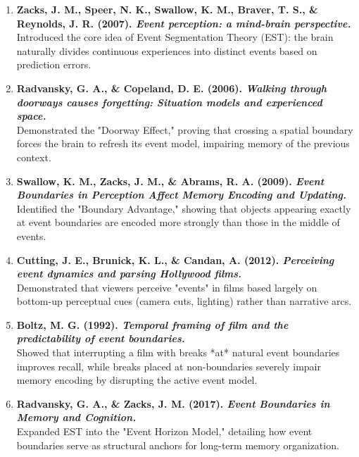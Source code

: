 \documentclass[10pt,a4paper]{article}
\begin{document}
\begin{enumerate}
    \item \textbf{Zacks, J. M., Speer, N. K., Swallow, K. M., Braver, T. S., \& Reynolds, J. R. (2007). \textit{Event perception: a mind-brain perspective.}} \\
    Introduced the core idea of Event Segmentation Theory (EST): the brain naturally divides continuous experiences into distinct events based on prediction errors.

    \item \textbf{Radvansky, G. A., \& Copeland, D. E. (2006). \textit{Walking through doorways causes forgetting: Situation models and experienced space.}} \\
    Demonstrated the "Doorway Effect," proving that crossing a spatial boundary forces the brain to refresh its event model, impairing memory of the previous context.

    \item \textbf{Swallow, K. M., Zacks, J. M., \& Abrams, R. A. (2009). \textit{Event Boundaries in Perception Affect Memory Encoding and Updating.}} \\
    Identified the "Boundary Advantage," showing that objects appearing exactly at event boundaries are encoded more strongly than those in the middle of events.

    \item \textbf{Cutting, J. E., Brunick, K. L., \& Candan, A. (2012). \textit{Perceiving event dynamics and parsing Hollywood films.}} \\
    Demonstrated that viewers perceive "events" in films based largely on bottom-up perceptual cues (camera cuts, lighting) rather than narrative arcs.

    \item \textbf{Boltz, M. G. (1992). \textit{Temporal framing of film and the predictability of event boundaries.}} \\
    Showed that interrupting a film with breaks *at* natural event boundaries improves recall, while breaks placed at non-boundaries severely impair memory encoding by disrupting the active event model.

    \item \textbf{Radvansky, G. A., \& Zacks, J. M. (2017). \textit{Event Boundaries in Memory and Cognition.}} \\
    Expanded EST into the "Event Horizon Model," detailing how event boundaries serve as structural anchors for long-term memory organization.
\end{enumerate}
\end{document}
